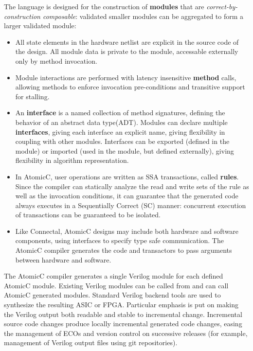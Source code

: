 The language is designed for
the construction of \textbf{modules}\cite{Parnas:1972} that are \textit{correct-by-construction composable}:
validated smaller modules can be aggregated to form
a larger validated module:
\begin{itemize}

\item All state elements in the hardware
netlist are explicit in the source code of the design.
All module data is private to the module, accessable externally only by method invocation.

\item Module interactions are performed with
latency insensitive\cite{Ng2010,AbbasB18}
\textbf{method} calls, allowing methods to enforce invocation pre-conditions
and transitive support for stalling.

\item An \textbf{interface} is a named collection of method signatures, defining
the behavior of an abstract data type(ADT).
Modules can declare
multiple \textbf{interfaces}, giving each interface an explicit name,
giving flexibility in coupling with other modules.
Interfaces can be exported (defined in the module) or imported (used in
the module, but defined externally), giving flexibility in algorithm
representation.

\item In AtomicC, user operations are written as SSA transactions, called \textbf{rules}.  Since the
compiler can statically analyze the read and write sets of the rule as well as the
invocation conditions, it can guarantee that the generated code always executes
in a Sequentially Correct (SC) manner: concurrent execution of transactions can be
guaranteed to be isolated.

\item Like Connectal\cite{king2015software}, AtomicC designs may include both hardware and
software components, using interfaces to specify type safe communication.
The AtomicC compiler generates the code and transactors to pass
arguments between hardware and software.

\end{itemize}

The AtomicC compiler 
generates a single Verilog module for each defined AtomicC module.
Existing Verilog modules can be called from and can call AtomicC
generated modules.
Standard Verilog backend tools are used to synthesize
the resulting ASIC or FPGA.
Particular emphasis is put on making the Verilog output both readable
and stable to incremental change.
Incremental source code changes produce locally incremental generated
code changes, easing the management of ECOs and version control
on successive releases (for example, management of Verilog output
files using git repositories).

